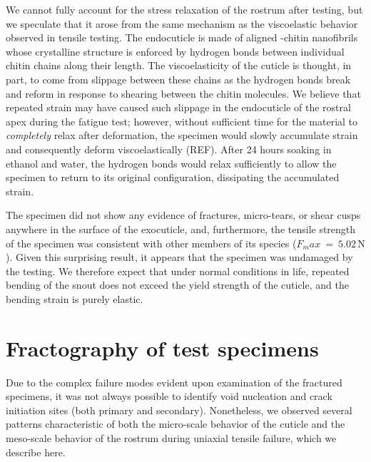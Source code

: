 \documentclass[twocolumn, linenumbers, superscriptaddress, nofootinbib]{revtex4-1}
\begin{document}
		We cannot fully account for the stress relaxation of the rostrum after testing, but we speculate that it arose from the same mechanism as the viscoelastic behavior observed in tensile testing.
		The endocuticle is made of aligned \textalpha-chitin nanofibrils whose crystalline structure is enforced by hydrogen bonds between individual chitin chains along their length.
		The viscoelasticity of the cuticle is thought, in part, to come from slippage between these chains as the hydrogen bonds break and reform in response to shearing between the chitin molecules.
		We believe that repeated strain may have caused such slippage in the endocuticle of the rostral apex during the fatigue test; however, without sufficient time for the material to \textit{completely} relax after deformation, the specimen would slowly accumulate strain and consequently deform viscoelastically (REF).
		After 24 hours soaking in ethanol and water, the hydrogen bonds would relax sufficiently to allow the specimen to return to its original configuration, dissipating the accumulated strain.
		
		The specimen did not show any evidence of fractures, micro-tears, or shear cusps anywhere in the surface of the exocuticle, and, furthermore, the tensile strength of the specimen was consistent with other members of its species ($F_max~=~5.02\,\text{N}$).
		Given this surprising result, it appears that the specimen was undamaged by the testing.
		We therefore expect that under normal conditions in life, repeated bending of the snout does not exceed the yield strength of the cuticle, and the bending strain is purely elastic.
			
	\section{Fractography of test specimens}
		Due to the complex failure modes evident upon examination of the fractured specimens, it was not always possible to identify void nucleation and crack initiation sites (both primary and secondary).
		Nonetheless, we observed several patterns characteristic of both the micro-scale behavior of the cuticle and the meso-scale behavior of the rostrum during uniaxial tensile failure, which we describe here.
		
\end{document}

